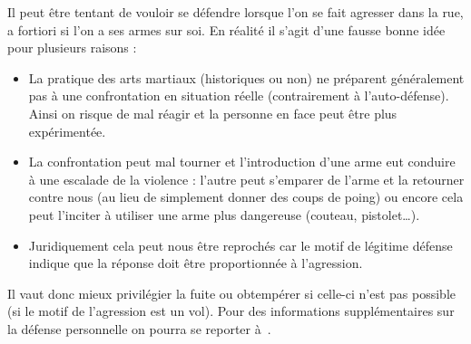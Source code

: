 Il peut être tentant de vouloir se défendre lorsque l'on se fait agresser dans la rue, a fortiori si l'on a ses armes sur soi.
En réalité il s'agit d'une fausse bonne idée pour plusieurs raisons :
\begin{itemize}
	\item La pratique des arts martiaux (historiques ou non) ne préparent généralement pas à une confrontation en situation réelle (contrairement à l'auto-défense).
	Ainsi on risque de mal réagir et la personne en face peut être plus expérimentée.
	
	\item La confrontation peut mal tourner et l'introduction d'une arme eut conduire à une escalade de la violence : l'autre peut s'emparer de l'arme et la retourner contre nous (au lieu de simplement donner des coups de poing) ou encore cela peut l'inciter à utiliser une arme plus dangereuse (couteau, pistolet…).
	
	\item Juridiquement cela peut nous être reprochés car le motif de légitime défense indique que la réponse doit être proportionnée à l'agression.
\end{itemize}
Il vaut donc mieux privilégier la fuite ou obtempérer si celle-ci n'est pas possible (si le motif de l'agression est un vol).
Pour des informations supplémentaires sur la défense personnelle on pourra se reporter à~\cite{Morel:2008:ProtegorGuidePratique}.
